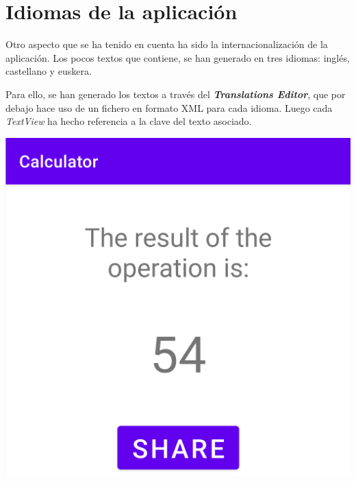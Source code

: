 \documentclass{\ClassPath/viu-tfm-template}
\begin{document}
\section{Idiomas de la aplicación}
Otro aspecto que se ha tenido en cuenta ha sido la internacionalización de la aplicación. Los pocos textos que contiene, se han generado en tres idiomas: inglés, castellano y euskera.

Para ello, se han generado los textos a través del \textit{\textbf{Translations Editor}}, que por debajo hace uso de un fichero en formato XML para cada idioma. Luego cada \textit{TextView} ha hecho referencia a la clave del texto asociado.

{
\begin{minipage}{0.32\linewidth}
    \includegraphics[frame,width=\linewidth]{img/english.png}
\end{minipage}
\hfill
\begin{minipage}{0.32\linewidth}

\end{minipage}}
\end{document}
